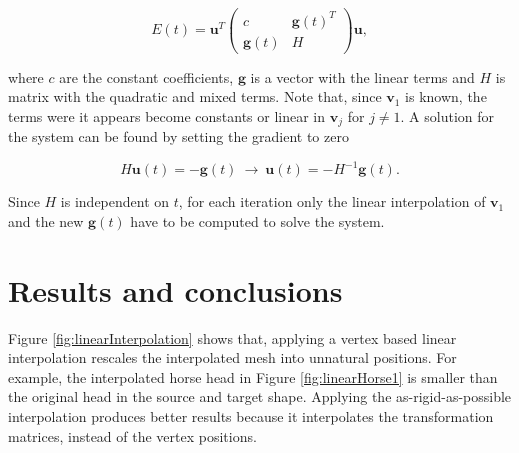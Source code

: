 \documentclass[12pt]{article}
\begin{document}
\begin{equation*}
E(t) = \mathbf{u}^T  \begin{pmatrix}
c & \mathbf{g}(t)^T \\
\mathbf{g}(t) & H
\end{pmatrix} \mathbf{u},
\end{equation*}

where $c$ are the constant coefficients, $\mathbf{g}$ is a vector with the linear terms and $H$ is matrix with the quadratic and mixed terms.
Note that, since $\mathbf{v}_1$ is known, the terms were it appears become constants or linear in $\mathbf{v}_j$ for $j \neq 1$.
A solution for the system can be found by setting the gradient to zero

\begin{equation*}
H \mathbf{u}(t) = -\mathbf{g}(t) ~ \rightarrow ~ \mathbf{u}(t) = - H ^{-1} \mathbf{g}(t).
\end{equation*}

Since $H$ is independent on $t$, for each iteration only the linear interpolation of $\mathbf{v}_1$ and the new $\mathbf{g}(t)$ have to be computed to solve the system.

\section{Results and conclusions}

Figure \ref{fig:linearInterpolation} shows that, applying a vertex based linear interpolation rescales the interpolated mesh into unnatural positions.
For example, the interpolated horse head in Figure \ref{fig:linearHorse1} is smaller than the original head in the source and target shape.
Applying the as-rigid-as-possible interpolation produces better results because it interpolates the transformation matrices, instead of the vertex positions.
\end{document}
